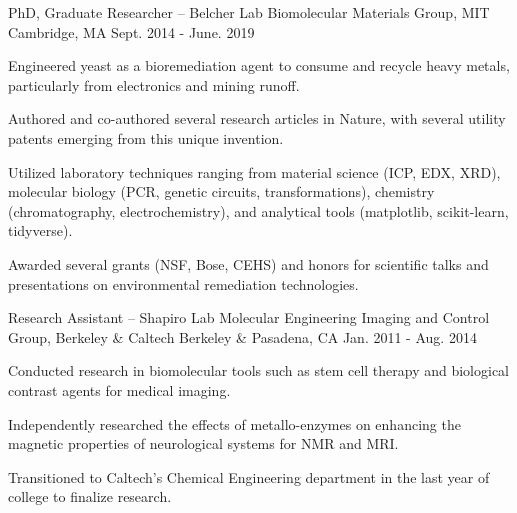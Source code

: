 

\begin{cventries}

\cventry
    {PhD, Graduate Researcher -- Belcher Lab} %
    {Biomolecular Materials Group, MIT} %
    {Cambridge, MA} %
    {Sept. 2014 - June. 2019} %
    {
      \begin{cvitems} %
        \item {Engineered yeast as a bioremediation agent to consume and recycle heavy metals, particularly from electronics and mining runoff.}
        \item {Authored and co-authored several research articles in Nature, with several utility patents emerging from this unique invention.}
        \item {Utilized laboratory techniques ranging from material science (ICP, EDX, XRD), molecular biology (PCR, genetic circuits, transformations), chemistry (chromatography, electrochemistry), and analytical tools (matplotlib, scikit-learn, tidyverse).}
        \item {Awarded several grants (NSF, Bose, CEHS) and honors for scientific talks and presentations on environmental remediation technologies.}
      \end{cvitems}
    }

 \cventry
    {Research Assistant -- Shapiro Lab} %
    {Molecular Engineering Imaging and Control Group, Berkeley \& Caltech} %
    {Berkeley \& Pasadena, CA} %
    {Jan. 2011 - Aug. 2014} %
    {
      \begin{cvitems} %
        \item {Conducted research in biomolecular tools such as stem cell therapy and biological contrast agents for medical imaging.}
        \item {Independently researched the effects of metallo-enzymes on enhancing the magnetic properties of neurological systems for NMR and MRI.}
        \item {Transitioned to Caltech's Chemical Engineering department in the last year of college to finalize research.}
      \end{cvitems}
    }


\end{cventries}
